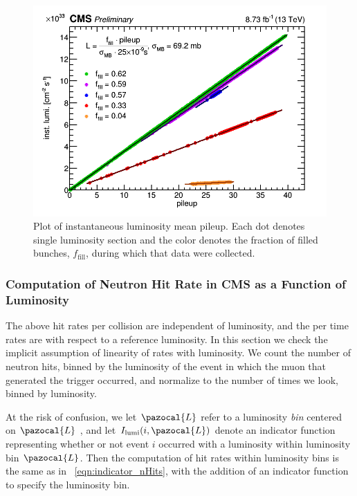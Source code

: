 \begin{figure}
	\centering
	\includegraphics[width=\dummyFigWidth]{figures/neutron/lumi_vs_pu_allfills.png}
  \caption[Plot of instantaneous luminosity \vs mean pileup.]{Plot of instantaneous luminosity \vs mean pileup. Each dot denotes single luminosity section and the color denotes the fraction of filled bunches, $f_\text{fill}$, during which that data were collected.}
	\label{fig:lumi_vs_pu}
\end{figure}

\subsubsection{Computation of Neutron Hit Rate in CMS as a Function of Luminosity}
\label{sec:hit_rate_vs_lumi}

The above hit rates per \pp collision are independent of luminosity, and the per time rates are with respect to a reference luminosity. In this section we check the implicit assumption of linearity of rates with luminosity. We count the number of neutron hits, binned by the luminosity of the event in which the muon that generated the trigger occurred, and normalize to the number of times we look, binned by luminosity. 

At the risk of confusion, we let $\pazocal{L}$ refer to a luminosity {\em bin} centered on $\pazocal{L}$ , and let $I_\text{lumi}(i, \pazocal{L})$ denote an indicator function representing whether or not event $i$ occurred with a luminosity within luminosity bin $\pazocal{L}$. Then the computation of hit rates within
luminosity bins is the same as in \Eq~\ref{eqn:indicator_nHits}, 
with the addition of an indicator function to specify the luminosity bin.

